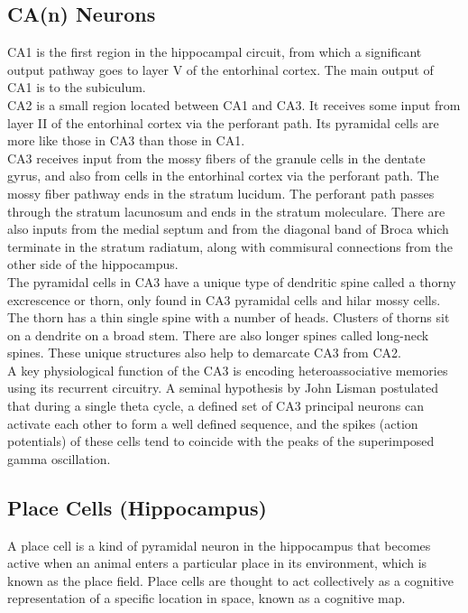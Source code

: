 \documentclass[11pt, a4paper]{article}
\begin{document}
\subsection{CA(n) Neurons}
CA1 is the first region in the hippocampal circuit, from which a significant output pathway goes to layer V of the entorhinal cortex. The main output of CA1 is to the subiculum. \\

CA2 is a small region located between CA1 and CA3. It receives some input from layer II of the entorhinal cortex via the perforant path. Its pyramidal cells are more like those in CA3 than those in CA1. \\

CA3 receives input from the mossy fibers of the granule cells in the dentate gyrus, and also from cells in the entorhinal cortex via the perforant path. The mossy fiber pathway ends in the stratum lucidum. The perforant path passes through the stratum lacunosum and ends in the stratum moleculare. There are also inputs from the medial septum and from the diagonal band of Broca which terminate in the stratum radiatum, along with commisural connections from the other side of the hippocampus. \\

The pyramidal cells in CA3 have a unique type of dendritic spine called a thorny excrescence or thorn, only found in CA3 pyramidal cells and hilar mossy cells. The thorn has a thin single spine with a number of heads. Clusters of thorns sit on a dendrite on a broad stem. There are also longer spines called long-neck spines. These unique structures also help to demarcate CA3 from CA2. \\

A key physiological function of the CA3 is encoding heteroassociative memories using its recurrent circuitry. A seminal hypothesis by John Lisman postulated that during a single theta cycle, a defined set of CA3 principal neurons can activate each other to form a well defined sequence, and the spikes (action potentials) of these cells tend to coincide with the peaks of the superimposed gamma oscillation.

\subsection{Place Cells (Hippocampus)}
A place cell is a kind of pyramidal neuron in the hippocampus that becomes active when an animal enters a particular place in its environment, which is known as the place field. Place cells are thought to act collectively as a cognitive representation of a specific location in space, known as a cognitive map.
\end{document}
